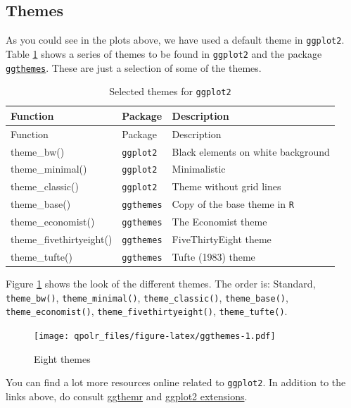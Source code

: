\documentclass[12pt,oneside]{reedthesis}
\theoremstyle{definition}
\theoremstyle{definition}
\theoremstyle{definition}
\theoremstyle{remark}
\begin{document}
  \subsection{Themes}\label{themes}
  
  As you could see in the plots above, we have used a default theme in
  \texttt{ggplot2}. Table \ref{tab:ggthemes} shows a series of themes to
  be found in \texttt{ggplot2} and the package
  \href{https://cran.r-project.org/web/packages/ggthemes/vignettes/ggthemes.html}{\texttt{ggthemes}}.
  These are just a selection of some of the themes.
  \begin{longtable}[]{@{}lll@{}}
  \caption{\label{tab:ggthemes} Selected themes for
  \texttt{ggplot2}}\tabularnewline
  \toprule
  Function & Package & Description\tabularnewline
  \midrule
  \endfirsthead
  \toprule
  Function & Package & Description\tabularnewline
  \midrule
  \endhead
  theme\_bw() & \texttt{ggplot2} & Black elements on white
  background\tabularnewline
  theme\_minimal() & \texttt{ggplot2} & Minimalistic\tabularnewline
  theme\_classic() & \texttt{ggplot2} & Theme without grid
  lines\tabularnewline
  theme\_base() & \texttt{ggthemes} & Copy of the base theme in
  \texttt{R}\tabularnewline
  theme\_economist() & \texttt{ggthemes} & The Economist
  theme\tabularnewline
  theme\_fivethirtyeight() & \texttt{ggthemes} & FiveThirtyEight
  theme\tabularnewline
  theme\_tufte() & \texttt{ggthemes} & Tufte (1983) theme\tabularnewline
  \bottomrule
  \end{longtable}
  Figure \ref{fig:ggthemes} shows the look of the different themes. The
  order is: Standard, \texttt{theme\_bw()}, \texttt{theme\_minimal()},
  \texttt{theme\_classic()}, \texttt{theme\_base()},
  \texttt{theme\_economist()}, \texttt{theme\_fivethirtyeight()},
  \texttt{theme\_tufte()}.
  \begin{figure}
  \centering
  \texttt{[image: qpolr\_files/figure-latex/ggthemes-1.pdf]}
  \caption{\label{fig:ggthemes}Eight themes}
  \end{figure}
  You can find a lot more resources online related to \texttt{ggplot2}. In
  addition to the links above, do consult
  \href{https://github.com/cttobin/ggthemr}{ggthemr} and
  \href{https://www.ggplot2-exts.org/}{ggplot2 extensions}.
  
\end{document}
